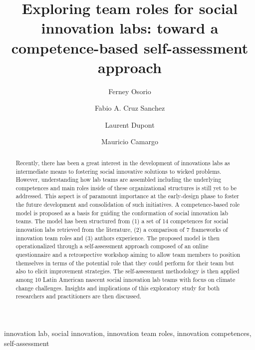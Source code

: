 \documentclass[]{elsarticle} %
\begin{document}
\begin{frontmatter}

  \title{Exploring team roles for social innovation labs: toward a
competence-based self-assessment approach}
    \author[ERPI,UN]{Ferney Osorio}
    \author[ERPI]{Fabio A. Cruz Sanchez}
  
    \author[ERPI]{Laurent Dupont}
  
    \author[ERPI]{Mauricio Camargo}
  
      \address[ERPI]{Université de Lorraine - ERPI -F-54000, Nancy,
France,}
    \address[UN]{Departamento de Ingeniería de Sistemas e Industrial,
Universidad Nacional de Colombia, Bogotá, Colombia}
  
  \begin{abstract}
  Recently, there has been a great interest in the development of
  innovations labs as intermediate means to fostering social innovative
  solutions to wicked problems. However, understanding how lab teams are
  assembled including the underlying competences and main roles inside
  of these organizational structures is still yet to be addressed. This
  aspect is of paramount importance at the early-design phase to foster
  the future development and consolidation of such initiatives. A
  competence-based role model is proposed as a basis for guiding the
  conformation of social innovation lab teams. The model has been
  structured from (1) a set of 14 competences for social innovation labs
  retrieved from the literature, (2) a comparison of 7 frameworks of
  innovation team roles and (3) authors experience. The proposed model
  is then operationalized through a self-assessment approach composed of
  an online questionnaire and a retrospective workshop aiming to allow
  team members to position themselves in terms of the potential role
  that they could perform for their team but also to elicit improvement
  strategies. The self-assessment methodology is then applied among 10
  Latin American nascent social innovation lab teams with focus on
  climate change challenges. Insights and implications of this
  exploratory study for both researchers and practitioners are then
  discussed.
  \end{abstract}
   \begin{keyword} innovation lab, social innovation, innovation team
roles, innovation competences, self-assessment\end{keyword}
 \end{frontmatter}
\end{document}
